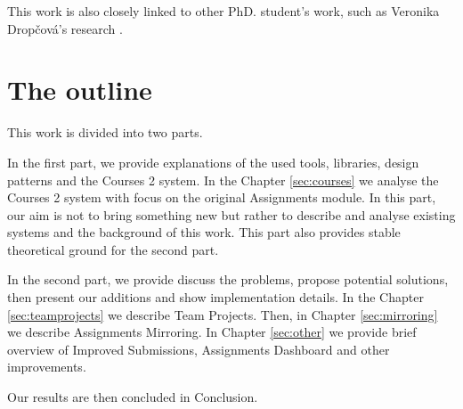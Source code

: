 This work is also closely linked to other PhD. student's work, such as Veronika Drop\v{c}ov\'{a}'s research \cite{dropcova}.


\section*{The outline}
This work is divided into two parts.

In the first part, we provide explanations of the used tools, libraries, design patterns and the Courses 2 system. In the Chapter \ref{sec:courses} we analyse the Courses 2 system with focus on the original Assignments module. In this part, our aim is not to bring something new but rather to describe and analyse existing systems and the background of this work. This part also provides stable theoretical ground for the second part.

In the second part, we provide discuss the problems, propose potential solutions, then present our additions and show implementation details. In the Chapter \ref{sec:teamprojects} we describe Team Projects. Then, in Chapter \ref{sec:mirroring} we describe Assignments Mirroring. In Chapter \ref{sec:other} we provide brief overview of Improved Submissions, Assignments Dashboard and other improvements.

Our results are then concluded in Conclusion.
